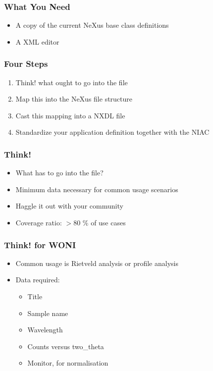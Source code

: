 \documentclass{beamer}
\begin{document}
\begin{frame}
\frametitle{What You Need}
\begin{itemize}
\item A copy of the current NeXus base class definitions
\item A XML editor 
\end{itemize}
\end{frame}


\begin{frame}
\frametitle{Four Steps}
\begin{enumerate}
\item {\color{blue} Think!} what ought to go into the file
\item {\color{blue}Map }this into the NeXus file structure
\item {\color{blue} Cast} this mapping into a NXDL file
\item {\color{blue} Standardize} your application definition together with the NIAC
\end{enumerate}
\end{frame}


\begin{frame}
\frametitle{Think!}
\begin{itemize}
\item What has to go into the file?
\item Minimum data necessary for common usage scenarios
\item Haggle it out with your community
\item Coverage ratio: $> 80$ \% of use cases
\end{itemize}
\end{frame}

\begin{frame}
\frametitle{Think! for WONI}
\begin{itemize}
\item Common usage is Rietveld analysis or profile analysis
\item Data required:
\begin{itemize}
\item Title
\item Sample name
\item Wavelength
\item Counts versus two\_theta
\item Monitor, for normalisation
\end{itemize}
\end{itemize}
\end{frame}
\end{document}
